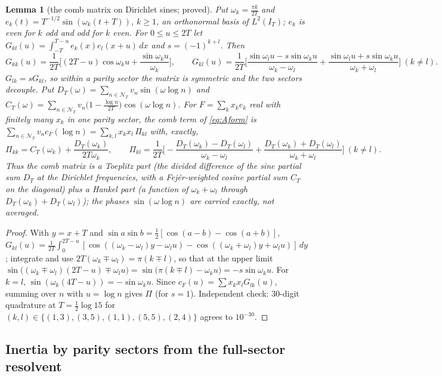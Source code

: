 \documentclass[11pt]{amsart}
\newtheorem{lemma}[theorem]{Lemma}
\theoremstyle{definition}
\theoremstyle{remark}
\newcommand{\IT}{I_T}
\newcommand{\cF}{c_F}
\newcommand{\NT}{\mathcal N_T}
\begin{document}
\begin{lemma}[the comb matrix on Dirichlet sines; proved]\label{lem:combsine}
Put $\omega_k=\frac{\pi k}{2T}$ and $e_k(t)=T^{-1/2}\sin(\omega_k(t+T))$, $k\ge1$, an orthonormal basis of $L^2(\IT)$; $e_k$ is
even for $k$ odd and odd for $k$ even. For $0\le u\le2T$ let $G_{kl}(u)=\int_{-T}^{T-u}e_k(x)e_l(x+u)\,dx$ and $s=(-1)^{k+l}$. Then
\[
G_{kk}(u)=\frac1{2T}\Big[(2T-u)\cos\omega_ku+\frac{\sin\omega_ku}{\omega_k}\Big],\qquad
G_{kl}(u)=\frac1{2T}\Big[\frac{\sin\omega_lu-s\sin\omega_ku}{\omega_k-\omega_l}+\frac{\sin\omega_lu+s\sin\omega_ku}{\omega_k+\omega_l}\Big]\ (k\ne l).
\]
$G_{lk}=sG_{kl}$, so within a parity sector the matrix is symmetric and the two sectors decouple. Put
$D_T(\omega)=\sum_{n\in\NT}v_n\sin(\omega\log n)$ and $C_T(\omega)=\sum_{n\in\NT}v_n\big(1-\frac{\log n}{2T}\big)\cos(\omega\log n)$.
For $F=\sum_kx_ke_k$ real with finitely many $x_k$ in one parity sector, the comb term of \eqref{eq:Aform} is
$\sum_{n\in\NT}v_n\cF(\log n)=\sum_{k,l}x_kx_l\,\Pi_{kl}$ with, exactly,
\[
\Pi_{kk}=C_T(\omega_k)+\frac{D_T(\omega_k)}{2T\omega_k},\qquad
\Pi_{kl}=\frac1{2T}\Big[-\frac{D_T(\omega_k)-D_T(\omega_l)}{\omega_k-\omega_l}+\frac{D_T(\omega_k)+D_T(\omega_l)}{\omega_k+\omega_l}\Big]\ (k\ne l).
\]
Thus the comb matrix is a Toeplitz part (the divided difference of the sine partial sum $D_T$ at the Dirichlet frequencies,
with a Fej\'er-weighted cosine partial sum $C_T$ on the diagonal) plus a Hankel part (a function of $\omega_k+\omega_l$ through
$D_T(\omega_k)+D_T(\omega_l)$); the phases $\sin(\omega\log n)$ are carried exactly, not averaged.
\end{lemma}
\begin{proof}
With $y=x+T$ and $\sin a\sin b=\frac12[\cos(a-b)-\cos(a+b)]$, $G_{kl}(u)=\frac1{2T}\int_0^{2T-u}[\cos((\omega_k-\omega_l)y-\omega_lu)
-\cos((\omega_k+\omega_l)y+\omega_lu)]\,dy$; integrate and use $2T(\omega_k\mp\omega_l)=\pi(k\mp l)$, so that at the upper limit
$\sin\big((\omega_k\mp\omega_l)(2T-u)\mp\omega_lu\big)=\sin\big(\pi(k\mp l)-\omega_ku\big)=-s\sin\omega_ku$. For $k=l$, $\sin(\omega_k(4T-u))=-\sin\omega_ku$. Since
$\cF(u)=\sum x_kx_lG_{lk}(u)$, summing over $n$ with $u=\log n$ gives $\Pi$ (for $s=1$). Independent check: 30-digit quadrature at
$T=\frac12\log15$ for $(k,l)\in\{(1,3),(3,5),(1,1),(5,5),(2,4)\}$ agrees to $10^{-30}$.
\end{proof}

\subsection{Inertia by parity sectors from the full-sector resolvent}\label{subsec:even-inertia}
\end{document}
